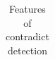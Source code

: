 \documentclass{beamer}
\begin{document}
\begin{frame}
{\begin{table}[]
\begin{tabular}{|l|l|lll}
		
		\end{tabular}
		\caption{Features of contradict detection}
		\label{tab:3}
\end{table}}

\end{frame}

\end{document}
